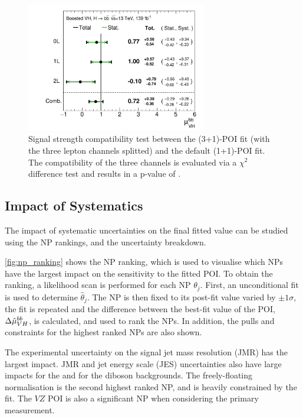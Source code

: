 \begin{figure}[!htbp]
  \centering
  \includegraphics[width=0.7\textwidth]{chapters/6.vhbb_boosted/figs/Plot_mu_102_VH.pdf}
  \caption{
    Signal strength compatibility test between the (3+1)-POI fit (with the three lepton channels splitted) and the default (1+1)-POI fit.
    The compatibility of the three channels is evaluated via a $\chi^2$ difference test and results in a p-value of  \cite{HIGG-2018-52}.
  }
  \label{fig:channel_comp}
\end{figure}



\subsection{Impact of Systematics}\label{sec:sys_results}

The impact of systematic uncertainties on the final fitted value \muhatbb can be studied using the NP rankings, and the uncertainty breakdown.

\cref{fig:np_ranking} shows the NP ranking, which is used to visualise which NPs have the largest impact on the sensitivity to the fitted POI.
To obtain the ranking, a likelihood scan is performed for each NP $\theta_j$.
First, an unconditional fit is used to determine $\hat{\theta}_j$.
The NP is then fixed to its post-fit value varied by $\pm 1 \sigma$, the fit is repeated and the difference between the best-fit value of the POI, $\Delta \hat{\mu}_{VH}^{bb}$, is calculated, and used to rank the NPs.
In addition, the pulls and constraints for the highest ranked NPs are also shown.

The experimental uncertainty on the signal \largeR jet mass resolution (JMR) has the largest impact.
JMR and jet energy scale (JES) uncertainties also have large impacts for the \Vjets and for the diboson backgrounds.
The freely-floating \Zhf normalisation is the second highest ranked NP, and is heavily constrained by the fit.
The $VZ$ POI \muVZ is also a significant NP when considering the primary \muVH measurement.

